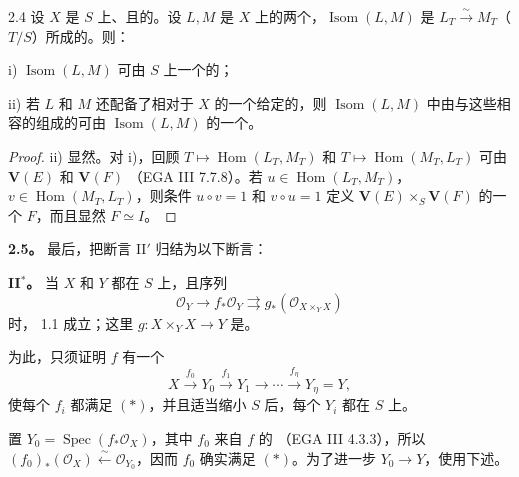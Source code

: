 \begin{SGAresult}{}{2.4}
设 $X$ 是 $S$ 上、且的。设 $L,M$ 是 $X$ 上的两个，$\operatorname{Isom}(L,M)$ 是 $L_T\xrightarrow\sim M_T$（$T/S$）所成的。则：

\textup{i)} $\operatorname{Isom}(L,M)$ 可由 $S$ 上一个的；

\textup{ii)} 若 $L$ 和 $M$ 还配备了相对于 $X$ 的一个给定的，则 $\operatorname{Isom}(L,M)$ 中由与这些相容的组成的可由 $\operatorname{Isom}(L,M)$ 的一个。
\end{SGAresult}
\begin{proof}
ii) 显然。对 i)，回顾 $T\mapsto\operatorname{Hom}(L_T,M_T)$ 和 $T\mapsto\operatorname{Hom}(M_T,L_T)$ 可由 $\mathbf V(E)$ 和 $\mathbf V(F)$ （EGA III 7.7.8）。若 $u\in\operatorname{Hom}(L_T,M_T)$，$v\in\operatorname{Hom}(M_T,L_T)$，则条件 $u\circ v=1$ 和 $v\circ u=1$ 定义 $\mathbf V(E)\times_S\mathbf V(F)$ 的一个 $F$，而且显然 $F\simeq I$。
\end{proof}

\textbf{2.5。} 最后，把断言 II$'$ 归结为以下断言：

\textbf{II$^*$。} 当 $X$ 和 $Y$ 都在 $S$ 上，且序列
\[
\mathcal O_Y\longrightarrow f_*\mathcal O_Y\rightrightarrows g_*(\mathcal O_{X\times_YX})\tag{*}
\]
时， 1.1 成立；这里 $g:X\times_YX\to Y$ 是。

为此，只须证明 $f$ 有一个
\[
X\xrightarrow{f_0}Y_0\xrightarrow{f_1}Y_1\longrightarrow\cdots\xrightarrow{f_\eta}Y_\eta=Y,
\]
使每个 $f_i$ 都满足 $(*)$，并且适当缩小 $S$ 后，每个 $Y_i$ 都在 $S$ 上。

置 $Y_0=\operatorname{Spec}(f_*\mathcal O_X)$，其中 $f_0$ 来自 $f$ 的 （EGA III 4.3.3），所以 $(f_0)_*(\mathcal O_X)\xleftarrow\sim\mathcal O_{Y_0}$，因而 $f_0$ 确实满足 $(*)$。为了进一步 $Y_0\to Y$，使用下述。

